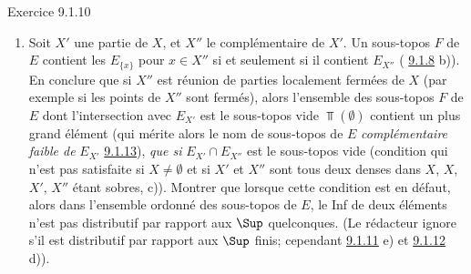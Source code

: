 \begin{enonce*}[remark]{Exercice 9.1.10}
\begin{enumerate}
\item Soit $X'$ une partie de $X$, et $X''$ le complémentaire de
$X'$. Un sous-topos $F$ de $E$ contient les $E_{\{x\}}$ pour $x\in
X''$ si et seulement si il contient $E_{X''}$ (\cf
\hyperref[IV.exer9.1.8]{9.1.8} b)). En conclure que si $X''$ est réunion de
parties localement fermées de $X$ (par exemple si les points de
$X''$ sont fermés), alors l'ensemble des sous-topos $F$ de $E$ dont
l'intersection avec $E_{X'}$ est le sous-topos vide $\Top(∅)$
contient un plus grand élément (qui mérite alors le nom de
sous-topos de $E$ \emph{complémentaire faible de} $E_{X'}$ \cf
\hyperref[IV.exer9.1.13]{9.1.13}), \emph{que si} $E_{X'}\cap E_{X''}$ est le
sous-topos vide (condition qui n'est pas satisfaite si $X\neq ∅$
et si $X'$ et $X''$ sont tous deux denses dans $X$, $X$, $X'$, $X''$
étant sobres, \cf c)). Montrer que lorsque cette condition est en
défaut, alors dans l'ensemble ordonné des sous-topos de $E$, le Inf
de deux éléments n'est pas distributif par rapport aux $\Sup$
quelconques. (Le rédacteur ignore s'il est distributif par rapport
aux $\Sup$ finis; \cf cependant \hyperref[IV.exer9.1.11]{9.1.11} e) et
\hyperref[IV.exer9.1.12]{9.1.12} d)).
\end{enumerate}
\end{enonce*}


